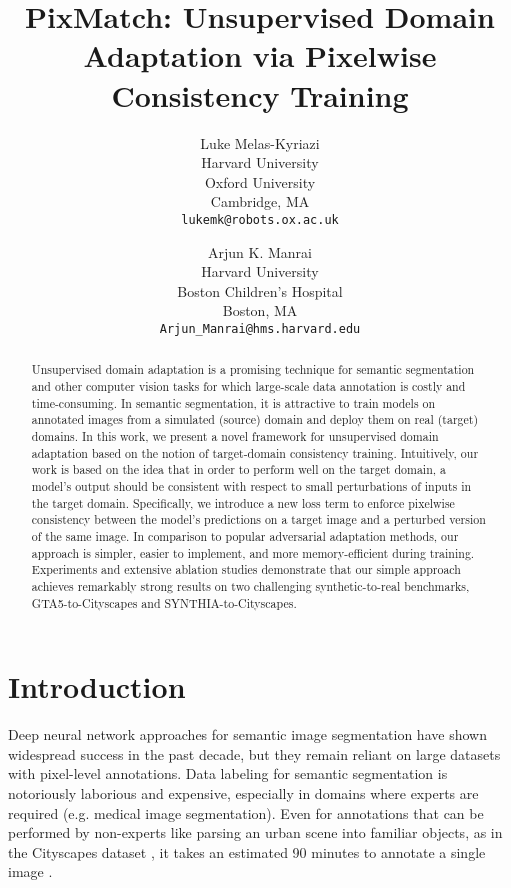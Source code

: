\documentclass[final]{cvpr}
\begin{document}
\title{PixMatch: Unsupervised Domain Adaptation via Pixelwise Consistency Training}

\author{Luke Melas-Kyriazi\\
Harvard University\\
Oxford University\\
Cambridge, MA\\
{\tt\small lukemk@robots.ox.ac.uk}
\and
Arjun K. Manrai \\
Harvard University \\
Boston Children's Hospital \\
Boston, MA \\
{\tt\small Arjun\_Manrai@hms.harvard.edu}
}

\maketitle

\begin{abstract}
Unsupervised domain adaptation is a promising technique for semantic segmentation and other computer vision tasks for which large-scale data annotation is costly and time-consuming. In semantic segmentation, it is attractive to train models on annotated images from a simulated (source) domain and deploy them on real (target) domains. 
In this work, we present a novel framework for unsupervised domain adaptation based on the notion of target-domain consistency training. 
Intuitively, our work is based on the idea that in order to perform well on the target domain, a model’s output should be consistent with respect to small perturbations of inputs in the target domain. Specifically, we introduce a new loss term to enforce pixelwise consistency between the model's predictions on a target image and a perturbed version of the same image.  
In comparison to popular adversarial adaptation methods, our approach is simpler, easier to implement, and more memory-efficient during training. Experiments and extensive ablation studies demonstrate that our simple approach achieves remarkably strong results on two challenging synthetic-to-real benchmarks, GTA5-to-Cityscapes and SYNTHIA-to-Cityscapes. 
\end{abstract}
\section{Introduction}

Deep neural network approaches for semantic image segmentation have shown widespread success in the past decade, but they remain reliant on large datasets with pixel-level annotations. Data labeling for semantic segmentation is notoriously laborious and expensive, especially in domains where experts are required (e.g. medical image segmentation). Even for annotations that can be performed by non-experts like parsing an urban scene into familiar objects, as in the Cityscapes dataset \cite{cityscapes}, it takes an estimated 90 minutes to annotate a single image \cite{statistic}. 
\end{document}

